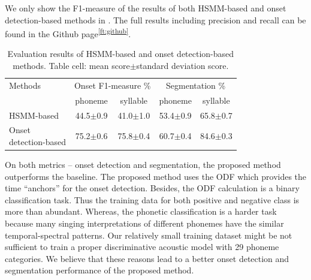 We only show the F1-measure of the results of both \gls{HSMM}-based and onset detection-based methods in . The full results including precision and recall can be found in the Github page\textsuperscript{\ref{ft:github}}. 

\begin{table}[ht]
  \centering
  \caption{Evaluation results of HSMM-based and onset detection-based methods. Table cell: mean score$\pm$standard deviation score.}
  \label{table:ch5:results_onset}
  \begin{tabular}{l|cccc}
    \toprule
    Methods & \multicolumn{2}{c}{Onset F1-measure \%} & \multicolumn{2}{c}{Segmentation \%} \\
            & phoneme & syllable &  phoneme & syllable \\
    \midrule
    HSMM-based & 44.5$\pm$0.9 & 41.0$\pm$1.0 & 53.4$\pm$0.9 & 65.8$\pm$0.7 \\

    \makecell[l]{Onset\\detection-based} & 75.2$\pm$0.6 & 75.8$\pm$0.4 & 60.7$\pm$0.4 & 84.6$\pm$0.3 \\
    \bottomrule
  \end{tabular}
\end{table}

On both metrics -- onset detection and segmentation, the proposed method outperforms the baseline. The proposed method uses the \gls{ODF} which provides the time ``anchors'' for the onset detection. Besides, the \gls{ODF} calculation is a binary classification task. Thus the training data for both positive and negative class is more than abundant. Whereas, the phonetic classification is a harder task because many singing interpretations of different phonemes have the similar temporal-spectral patterns. Our relatively small training dataset might be not sufficient to train a proper discriminative acoustic model with 29 phoneme categories. We believe that these reasons lead to a better onset detection and segmentation performance of the proposed method.

